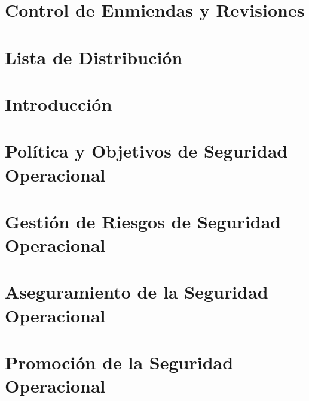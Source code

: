 \documentclass[12pt,openany]{report}
\begin{document}
\chapter*{Control de Enmiendas y Revisiones}


\chapter*{Lista de Distribución}

\label{fin_prelim}

\clearpage

\justifying
{}
\setlength{\emergencystretch}{3em}
\setlength{\parindent}{0pt}


\chapter{Introducción}
\label{inicio_cap1}

\label{fin_cap1}

\chapter{Política y Objetivos de Seguridad Operacional}
\label{inicio_cap2}

\label{fin_cap2}

\chapter{Gestión de Riesgos de Seguridad Operacional}
\label{inicio_cap3}

\label{fin_cap3}

\chapter{Aseguramiento de la Seguridad Operacional}
\label{inicio_cap4}

\label{fin_cap4}

\chapter{Promoción de la Seguridad Operacional}
\label{inicio_cap5}

\label{fin_cap5}


\label{fin_anexos}
\end{document}
